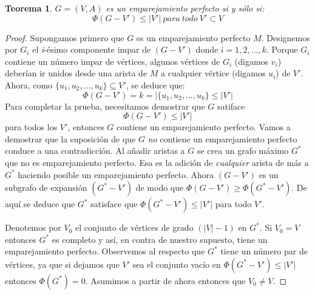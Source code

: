 \documentclass[10pt,a5paper]{book}
\newtheorem{teorema}{Teorema}[chapter]
\begin{document}
\begin{teorema}
$G = (V, A)$ es un emparejamiento perfecto si y sólo si:
\[ \Phi(G - V') \le |V'|\ para\ todo\ V' \subset V \]
\end{teorema}
\begin{proof}
Supongamos primero que $G$ es un emparejamiento perfecto $M$. Designemos por $G_i$ el \emph{i}-ésimo componente impar de $(G - V')$ donde $i = 1, 2, \ldots, k$. Porque $G_i$ contiene un número impar de vértices, algunos vértices de $G_i$ (digamos $v_i$) deberían ir unidos desde una arista de $M$ a cualquier vértice (digamos $u_i$) de $V'$. Ahora, como $\{u_1,u_2, \ldots, u_k\} \subseteq V'$, se deduce que:
\[\Phi(G - V') = k = |\{u_1, u_2, \ldots, u_k\} \le |V'| \]
Para completar la prueba, necesitamos demostrar que $G$ satiface
\[\Phi(G - V') \le |V'| \]
para todos los $V'$, entonces $G$ contiene un emparejamiento perfecto. Vamos a demostrar que la suposición de que $G$ \emph{no} contiene un emparejamiento perfecto conduce a una contradicción. Al añadir aristas a $G$ se crea un grafo máximo $G^*$ que no es emparejamiento perfecto. Esa es la adición de \emph{cualquier} arista de más a $G^*$ haciendo posible un emparejamiento perfecto. Ahora $(G - V')$ es un subgrafo de expansión $(G^* - V')$ de modo que $\Phi(G - V') \ge \Phi(G^* - V')$. De aquí se deduce que $G^*$ satisface que $\Phi(G^* - V') \le |V'|$ para todo $V'$.

Denotemos por $V_0$ el conjunto de vértices de grado $(|V| - 1)$ en $G^*$. Si $V_0 = V$ entonces $G^*$ es completo y así, en contra de nuestro supuesto, tiene un emparejamiento perfecto. Observemos al respecto que $G^*$ tiene un número par de vértices, ya que si dejamos que $V'$ sea el conjunto vacío en $\Phi(G^* - V') \le |V'|$ entonces $\Phi(G^*) = 0$. Asumimos a partir de ahora entonces que $V_0 \ne V$.


\end{proof}
\end{document}

